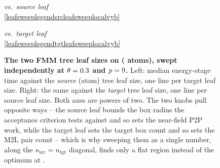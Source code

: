 \begin{figure}[!htb]

\vspace{0.4ex}
\begin{minipage}[t]{7.4cm}
\centering
{\scriptsize\emph{vs.\ source leaf}}\\[0.2ex]
\ref{leafsweeplegendsrcleafsweeplocalvyb}
\end{minipage}%
\hspace*{1.5cm}%
\begin{minipage}[t]{7.4cm}
\centering
{\scriptsize\emph{vs.\ target leaf}}\\[0.2ex]
\ref{leafsweeplegendtgtleafsweeplocalvyb}
\end{minipage}

\caption[FMM leaf sizes swept independently]{\textbf{The two FMM tree leaf sizes
    on \leafMoleculeleafsweeplocalvyb{} (\leafNatomsleafsweeplocalvyb{} atoms), swept independently at
    $\theta = 0.3{}$ and $p = 9{}$.} Left: median energy-stage time
    against the \emph{source} (atom) tree leaf size,
    one line per target leaf size. Right: the same against the \emph{target}
    tree leaf size, one line per source leaf size. Both axes are
    powers of two. The two knobs pull opposite ways -- the source leaf bounds the
    box radius the acceptance criterion tests against and so sets the near-field
    P2P work, while the target leaf sets the target box count and so sets the M2L
    pair count -- which is why sweeping them as a single number, along the
    $n_{\mathrm{src}} = n_{\mathrm{tgt}}$ diagonal, finds only a flat region
    instead of the optimum at \leafBestleafsweeplocalvyb{}.\leafNaiveNoteleafsweeplocalvyb}
\label{fig:leaf_sweep_local_6vyb}
\end{figure}
